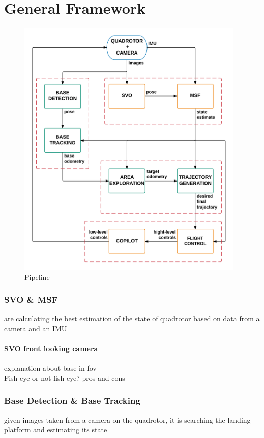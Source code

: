 \chapter{General Framework}\label{chap:general_framework}

\begin{figure}[!ht]
    \centering
    \includegraphics[width=0.97\textwidth]{img/pipeline_diagram.png}
    \caption{Pipeline}
    \label{fig:pipeline_diagram}
\end{figure}

\subsection{SVO \& MSF}
are calculating the best estimation of the state of quadrotor based on data from a camera and an IMU
\subsubsection{SVO front looking camera}
explanation about base in fov\\
Fish eye or not fish eye? pros and cons
\subsection{Base Detection \& Base Tracking}
given images taken from a camera on the quadrotor, it is searching the landing platform and estimating its state
